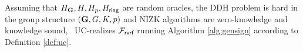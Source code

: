 

\begin{theorem}
	Assuming that $ H_{\mathbf{G}}, H,H_p, H_\mathsf{ring} $ are random oracles,  the DDH problem is hard in the group structure $ ({\mathbf{G}}, G,K, p) $ and NIZK algorithms are zero-knowledge and knowledge sound, \name \ UC-realizes $\mathcal{F}_{\textsf{rvrf}}$ running Algorithm \ref{alg:gensign} according to Definition \ref{def:uc}.
\end{theorem}

